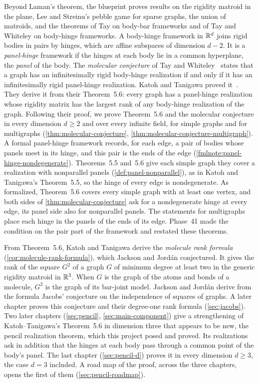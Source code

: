 Beyond Laman's theorem, the blueprint proves results on the rigidity
matroid in the plane, Lee and Streinu's pebble game for sparse graphs, the
union of matroids, and the theorems of Tay on body-bar frameworks and of
Tay and Whiteley on body-hinge frameworks. A body-hinge framework in
${\mathbb{R}}^d$ joins rigid bodies in pairs by hinges, which are affine subspaces of
dimension $d - 2$. It is a \emph{panel-hinge} framework if the hinges at
each body lie in a common hyperplane, the \emph{panel} of the body. The
\emph{molecular conjecture} of Tay and Whiteley~\cite{tayWhiteley1984}
states that a graph has an infinitesimally rigid body-hinge realization if
and only if it has an infinitesimally rigid panel-hinge realization. Katoh
and Tanigawa proved it~\cite{katohTanigawa2011}. They derive it from their
Theorem~5.6: every graph has a panel-hinge realization whose rigidity
matrix has the largest rank of any body-hinge realization of the graph.
Following their proof, we prove Theorem~5.6 and the molecular conjecture
in every dimension $d \ge 2$ and over every infinite field, for simple
graphs and for multigraphs (\cref{thm:molecular-conjecture},
\cref{thm:molecular-conjecture-multigraph}). A formal panel-hinge
framework records, for each edge, a pair of bodies whose panels meet in
its hinge, and this pair is the ends of the edge
(\cref{fmlnote:panel-hinge-nondegenerate}). Theorems~5.5 and~5.6 give
each simple graph they cover a realization with nonparallel panels
(\cref{def:panel-nonparallel}), as in Katoh and Tanigawa's
Theorem~5.5, so the hinge of every edge is nondegenerate. As
formalized, Theorem~5.6 covers every simple graph with at least one
vertex, and both sides of \cref{thm:molecular-conjecture} ask for a
nondegenerate hinge at every edge, its panel side also for nonparallel
panels. The statements for multigraphs place each hinge in the panels
of the ends of its edge. Phase~41 made the condition on the pair part
of the framework and restated these theorems.

From Theorem~5.6, Katoh and Tanigawa derive the \emph{molecule rank
formula} (\cref{cor:molecule-rank-formula}), which Jackson and Jord\'an
conjectured. It gives the rank of the square $G^2$ of a graph $G$ of
minimum degree at least two in the generic rigidity matroid in ${\mathbb{R}}^3$.
When $G$ is the graph of the atoms and bonds of a molecule, $G^2$ is the
graph of its bar-joint model. Jackson and Jord\'an derive from the formula
Jacobs' conjecture on the independence of squares of graphs. A later
chapter proves this conjecture and their degree-one rank formula
(\cref{sec:jacobs}). Two
later chapters (\cref{sec:pencil}, \cref{sec:main-component}) give a
strengthening of Katoh--Tanigawa's Theorem~5.6 in dimension three that
appears to be new, the pencil realization theorem, which this project
posed and proved. Its realizations ask in addition that the hinges at each
body pass through a common point of the body's panel. The last chapter
(\cref{sec:pencil-d}) proves it in every dimension $d \ge 3$, the case
$d = 3$ included. A road map of the proof, across the three chapters,
opens the first of them (\cref{sec:pencil-roadmap}).

